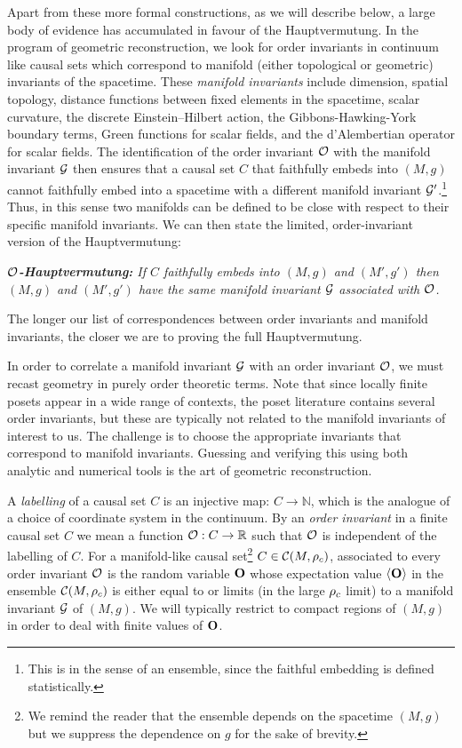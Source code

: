 Apart from these more formal constructions, as we will describe below, a large body of evidence has accumulated in
favour of the Hauptvermutung.  In the program of geometric reconstruction, we look for order invariants in continuum
like causal sets which correspond to manifold (either topological or geometric) invariants of the spacetime.  These
\emph{manifold invariants} include dimension, spatial topology, distance functions between fixed elements in the spacetime,
scalar curvature, the discrete Einstein--Hilbert action, the Gibbons-Hawking-York boundary terms, Green functions for
scalar fields, and the d'Alembertian operator for scalar fields. The identification of the order invariant $\mathcal O$ with
the manifold invariant $\mathcal G$ then ensures that a causal set $C$ that faithfully embeds into $(M,g)$ cannot faithfully
embed into a spacetime with a different manifold invariant $\mathcal G'$.\footnote{This is in the sense of an ensemble,
  since the faithful embedding is defined statistically.}  Thus, in this sense two manifolds can be defined to be  close with respect to
their specific manifold invariants. We can then state the  limited,  order-invariant version of the Hauptvermutung: 

\textit{\textbf{$\mathcal O$-Hauptvermutung:}  If $C$ faithfully
  embeds into $(M,g)$ and $(M',g')$ then $(M,g)$ and $(M',g')$ have the same manifold invariant $\mathcal G$ associated with 
  $\mathcal O$.}

The longer our list of correspondences between order invariants and manifold invariants, the closer we are
to proving the full Hauptvermutung.


In order to correlate a manifold invariant $\mathcal G$ with an order invariant  $\mathcal O$, we must   recast geometry in purely
order theoretic terms.  Note that since locally finite posets appear in a wide range of
contexts,  the poset literature contains several order invariants, but these are typically not related to  the manifold
invariants of interest to us.  The challenge is to choose the appropriate invariants that  correspond to manifold  invariants. Guessing and verifying this using
both analytic and numerical tools is the art of geometric
reconstruction. 

A \emph{labelling} of a causal set $C$ is an injective map: $C \rightarrow \mathbb N$, which is the 
analogue of a choice of coordinate system in the continuum.  By an \emph{order invariant} in a finite causal set $C$ we mean a function $\mathcal O: C \rightarrow \mathbb R$ such that $\mathcal O$ is
independent of the {labelling} of $C$. For a manifold-like causal set\footnote{We remind the reader
  that the ensemble depends on the spacetime $(M,g)$ but we suppress the dependence on $g$ for the sake of brevity.} $C \in \mathcal C(M,\rho_c)$, associated to every order
invariant $\mathcal O$ is the random variable $\mathbf O$ whose expectation value $\langle {\mathbf O} \rangle $ in the ensemble $\mathcal C(M,\rho_c)$ is either equal to or limits (in
the large $\rho_c$ limit) to a manifold invariant $\mathcal G$ of $(M,g)$.  We will typically  restrict to compact regions of $(M,g)$ in order to deal
with finite values of $\mathbf O$.


